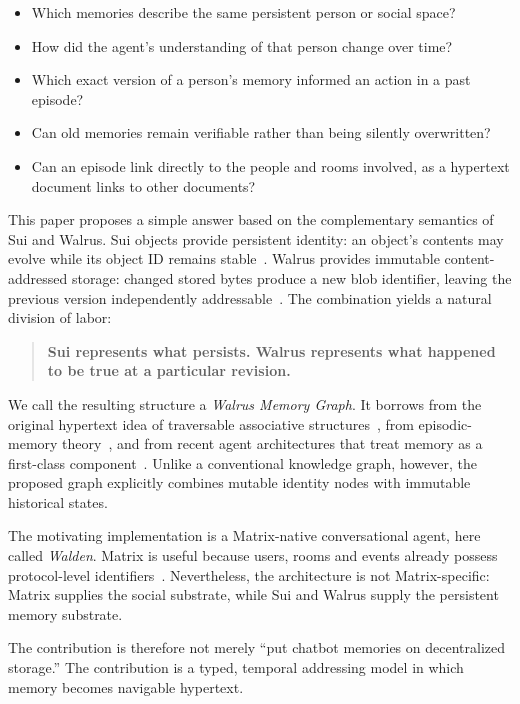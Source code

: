 \documentclass[11pt]{article}
\begin{document}
\begin{itemize}[nosep]
    \item Which memories describe the same persistent person or social space?
    \item How did the agent's understanding of that person change over time?
    \item Which exact version of a person's memory informed an action in a past episode?
    \item Can old memories remain verifiable rather than being silently overwritten?
    \item Can an episode link directly to the people and rooms involved, as a hypertext document links to other documents?
\end{itemize}

This paper proposes a simple answer based on the complementary semantics of Sui and Walrus. Sui objects provide persistent identity: an object's contents may evolve while its object ID remains stable~\cite{sui}. Walrus provides immutable content-addressed storage: changed stored bytes produce a new blob identifier, leaving the previous version independently addressable~\cite{walrus-lineage,walrus-whitepaper}. The combination yields a natural division of labor:

\begin{quote}
\textbf{Sui represents what persists. Walrus represents what happened to be true at a particular revision.}
\end{quote}

We call the resulting structure a \emph{Walrus Memory Graph}. It borrows from the original hypertext idea of traversable associative structures~\cite{bush,nelson}, from episodic-memory theory~\cite{tulving}, and from recent agent architectures that treat memory as a first-class component~\cite{generative-agents,memgpt}. Unlike a conventional knowledge graph, however, the proposed graph explicitly combines mutable identity nodes with immutable historical states.

The motivating implementation is a Matrix-native conversational agent, here called \emph{Walden}. Matrix is useful because users, rooms and events already possess protocol-level identifiers~\cite{matrix-spec}. Nevertheless, the architecture is not Matrix-specific: Matrix supplies the social substrate, while Sui and Walrus supply the persistent memory substrate.

The contribution is therefore not merely ``put chatbot memories on decentralized storage.'' The contribution is a typed, temporal addressing model in which memory becomes navigable hypertext.
\end{document}
